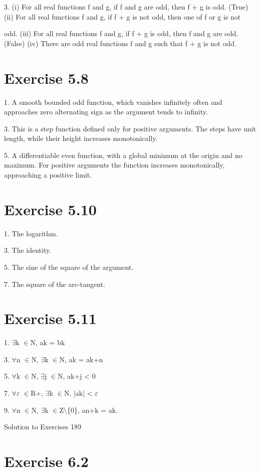 \documentclass[11pt]{article}
\theoremstyle{plain}
\theoremstyle{definition}
\begin{document}
3. (i) For all real functions f and g, if f and g are odd, then f + g is odd. (True) (ii) For all real functions f and g, if f + g is not odd, then one of f or g is not

odd. (iii) For all real functions f and g, if f + g is odd, then f and g are odd. (False) (iv) There are odd real functions f and g such that f + g is not odd.

\section{Exercise 5.8}

1. A smooth bounded odd function, which vanishes infinitely often and approaches zero alternating sign as the argument tends to infinity.

3. This is a step function defined only for positive arguments. The steps have unit length, while their height increases monotonically.

5. A differentiable even function, with a global minimum at the origin and no maximum. For positive arguments the function increases monotonically, approaching a positive limit.

\section{Exercise 5.10}

1. The logarithm.

3. The identity.

5. The sine of the square of the argument.

7. The square of the arc-tangent.

\section{Exercise 5.11}

1. $\exists$k $\in$N, ak = bk

3. $\forall$n $\in$N, $\exists$k $\in$N, ak = ak+n

5. $\forall$k $\in$N, $\exists$j $\in$N, ak+j < 0

7. $\forall$$\varepsilon$ $\in$R+, $\exists$k $\in$N, |ak| < $\varepsilon$

9. $\forall$n $\in$N, $\exists$k $\in$Z$\setminus$\{0\}, an+k = ak.

Solution to Exercises 189

\section{Exercise 6.2}
\end{document}
